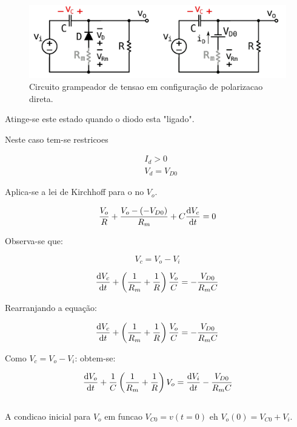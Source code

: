 \begin{figure}[h]
    \centering
    \includegraphics[width=1\columnwidth]{images/o_circuito_direto.png}
    \caption{Circuito grampeador de tensao em configuração de polarizacao direta.}
\end{figure}

Atinge-se este estado quando o diodo esta "ligado".

Neste caso tem-se restricoes

\begin{equation}
    \begin{aligned}
         & I_d > 0      \\
         & V_d = V_{D0}
    \end{aligned}
\end{equation}

Aplica-se a lei de Kirchhoff para o no $V_o$.

\begin{equation}
    \frac{V_o}{R} + \frac{V_o - ( - V_{D0})}{R_m} + C \frac{\mathrm d V_c}{\mathrm d t} = 0
\end{equation}

Observa-se que:

\begin{equation}
    V_c = V_o - V_i
\end{equation}

\begin{equation}
    \frac{\mathrm d V_c}{\mathrm d t} + \left( \frac{1}{R_m} + \frac{1}{R} \right) \frac{V_o}{C} = - \frac{V_{D0}}{R_m C}
\end{equation}

Rearranjando a equação:

\begin{equation}
    \frac{\mathrm d V_c}{\mathrm d t} + \left( \frac{1}{R_m} + \frac{1}{R}\right) \frac{V_o}{C} = - \frac{V_{D0}}{R_m C}
\end{equation}

Como $V_c = V_o - V_i$: obtem-se:

\begin{equation}
    \label{eq:diff_eq1}
    \frac{\mathrm d V_o}{\mathrm d t} + \frac{1}{C} \left(\frac{1}{R_m} + \frac{1}{R} \right) V_o = \frac{\mathrm d V_i}{\mathrm d t} - \frac{V_{D0}}{R_m C}
\end{equation}
\\
A condicao inicial para  $V_o$ em funcao $V_{C0} = v(t=0)$ eh $V_o(0) = V_{C0} + V_i$.\\

